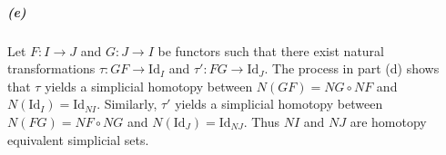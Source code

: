 \documentclass{article}
\begin{document}
\subparagraph{(e)}Let $F\colon I\rightarrow J$ and $G\colon J\rightarrow I$ be functors such that there exist natural transformations $\tau\colon GF\rightarrow\text{Id}_I$ and $\tau'\colon FG\rightarrow\text{Id}_J.$ The process in part (d) shows that $\tau$ yields a simplicial homotopy between $N(GF)=NG\circ NF$ and $N(\text{Id}_I)=\text{Id}_{NI}.$ Similarly, $\tau'$ yields a simplicial homotopy between $N(FG)=NF\circ NG$ and $N(\text{Id}_J)=\text{Id}_{NJ}.$ Thus $NI$ and $NJ$ are homotopy equivalent simplicial sets.
\end{document}
